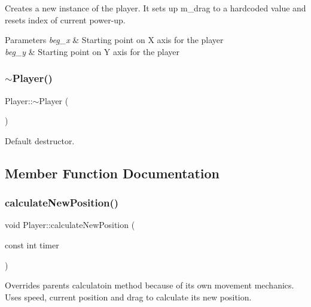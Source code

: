 Creates a new instance of the player. It sets up m\+\_\+drag to a hardcoded value and resets index of current power-\/up.


\begin{DoxyParams}{Parameters}
{\em beg\+\_\+x} & Starting point on X axis for the player \\
\hline
{\em beg\+\_\+y} & Starting point on Y axis for the player \\
\hline
\end{DoxyParams}
\mbox{\label{classPlayer_a749d2c00e1fe0f5c2746f7505a58c062}} 
\subsubsection{\texorpdfstring{$\sim$\+Player()}{~Player()}}
{\footnotesize\ttfamily Player\+::$\sim$\+Player (\begin{DoxyParamCaption}{ }\end{DoxyParamCaption})}



Default destructor. 



\subsection{Member Function Documentation}
\mbox{\label{classPlayer_a574659d927fef4b34544b728c1631433}} 
\subsubsection{\texorpdfstring{calculate\+New\+Position()}{calculateNewPosition()}}
{\footnotesize\ttfamily void Player\+::calculate\+New\+Position (\begin{DoxyParamCaption}\item[{const int}]{timer }\end{DoxyParamCaption})\hspace{0.3cm}{\ttfamily [virtual]}}

Overrides parent\textquotesingle{}s calculatoin method because of it\textquotesingle{}s own movement mechanics. Uses speed, current position and drag to calculate it\textquotesingle{}s new position.


